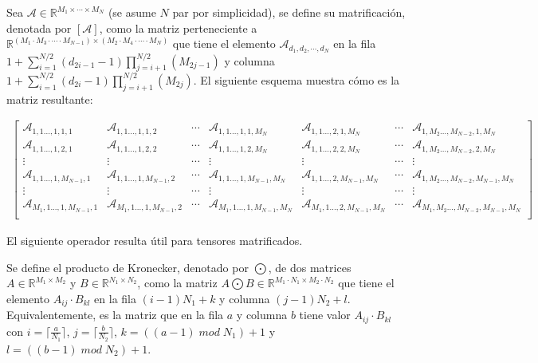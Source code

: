 \begin{definicion}
Sea $\mathcal{A}\in\mathbb{R}^{M_1\times\cdots \times M_N}$ (se asume $N$ par por simplicidad), se define su matrificación, denotada por $[\mathcal{A}]$, como la matriz perteneciente a $\mathbb{R}^{(M_1\cdot M_3\cdot \cdots \cdot M_{N-1})\times(M_2\cdot M_4\cdot \cdots \cdot M_{N})}$ que tiene el elemento $\mathcal{A}_{d_1,d_2,\cdots ,d_N}$ en la fila $1+\sum_{i=1}^{N/2}(d_{2i-1}-1)\prod_{j=i+1}^{N/2}(M_{2j-1})$ y columna $1+\sum_{i=1}^{N/2}(d_{2i}-1)\prod_{j=i+1}^{N/2}(M_{2j})$. El siguiente esquema muestra cómo es la matriz resultante:
\small
\begin{adjustwidth}{-6em}{-5em}
\begin{align*}
\begin{bmatrix}
\mathcal{A}_{1,1... ,1,1,1} & \mathcal{A}_{1,1... ,1,1,2} & \cdots  & \mathcal{A}_{1,1... ,1,1,M_N} & \mathcal{A}_{1,1... ,2,1,M_N} & \cdots  & \mathcal{A}_{1,M_2... ,M_{N-2},1,M_N}\\
\mathcal{A}_{1,1... ,1,2,1} & \mathcal{A}_{1,1... ,1,2,2} & \cdots  & \mathcal{A}_{1,1... ,1,2,M_N} & \mathcal{A}_{1,1... ,2,2,M_N} & \cdots  & \mathcal{A}_{1,M_2... ,M_{N-2},2,M_N}\\
\vdots & \vdots &  \cdots  & \vdots &  \vdots & \cdots  &  \vdots \\
\mathcal{A}_{1,1... ,1,M_{N-1},1} & \mathcal{A}_{1,1... ,1,M_{N-1},2} & \cdots  & \mathcal{A}_{1,1... ,1,M_{N-1},M_N} & \mathcal{A}_{1,1... ,2,M_{N-1},M_N} & \cdots  & \mathcal{A}_{1,M_2... ,M_{N-2},M_{N-1},M_N}\\
\vdots & \vdots &  \cdots   & \vdots &  \vdots & \cdots  &  \vdots \\
\mathcal{A}_{M_1,1... ,1,M_{N-1},1} & \mathcal{A}_{M_1,1... ,1,M_{N-1},2} & \cdots  & \mathcal{A}_{M_1,1... ,1,M_{N-1},M_N} & \mathcal{A}_{M_1,1... ,2,M_{N-1},M_N} & \cdots  & \mathcal{A}_{M_1,M_2... ,M_{N-2},M_{N-1},M_N}\\
\end{bmatrix}
\end{align*}
\end{adjustwidth}
\normalsize
\end{definicion}

El siguiente operador resulta útil para tensores matrificados.

\begin{definicion}
Se define el producto de Kronecker, denotado por $\bigodot$, de dos matrices $A\in \mathbb{R}^{M_1 \times M_2}$ y $B\in \mathbb{R}^{N_1 \times N_2}$, como la matriz $A\bigodot B\in\mathbb{R}^{M_1\cdot N_1 \times M_2 \cdot N_2}$ que tiene el elemento $A_{ij}\cdot B_{kl}$ en la fila $(i-1)N_1+k$ y columna $(j-1)N_2+l$. Equivalentemente, es la matriz que en la fila $a$ y columna $b$ tiene valor $A_{ij}\cdot B_{kl}$ con $i = \lceil \frac{a}{N_1} \rceil$, $j= \lceil \frac{b}{N_2} \rceil$, $k = ((a-1) \; mod \; N_1)+1$ y  $l =((b-1) \; mod  \; N_2)+1 $.

\end{definicion}

